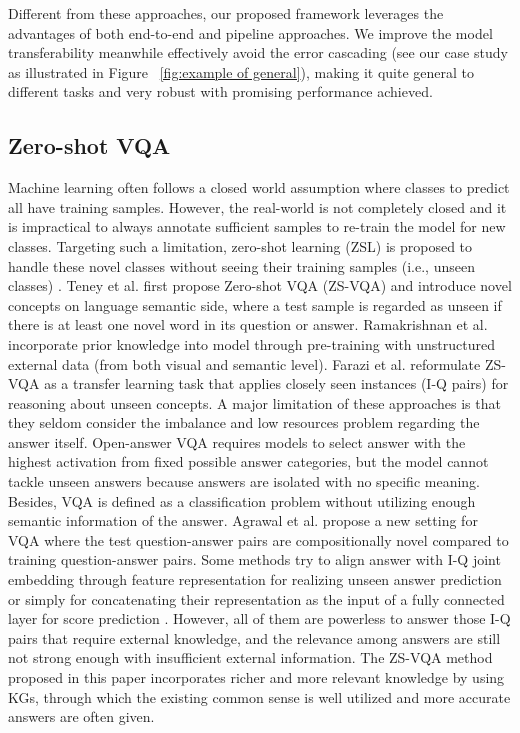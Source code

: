 \documentclass[runningheads]{llncs}
\newcommand{\cjy}[1]{{\color{black}#1}}
\begin{document}
Different from these approaches, our proposed framework leverages \cjy{the advantages of both end-to-end and pipeline approaches}. We improve the model transferability meanwhile \cjy{effectively avoid} the error cascading (see our case study as illustrated in Figure~ \ref{fig:example of general}), \cjy{making it quite general to different tasks and very robust with promising performance achieved.}
\subsection{Zero-shot VQA}\label{tab:Zero-shot VQA}
Machine learning often follows a closed world assumption \cjy{where classes to predict all have training samples.}
 However, the real-world is not completely closed and it is impractical to always annotate sufficient samples to re-train the model for new classes. Targeting such a limitation, zero-shot learning (ZSL) is proposed to handle these novel classes without seeing their training samples (i.e., unseen classes) \cite{DBLP:conf/www/GengC0PYYJC21,chen2021knowledge}.
Teney et al. \cite{DBLP:journals/corr/TeneyH16a} first propose Zero-shot VQA (ZS-VQA) and introduce novel concepts on language semantic side, where a test sample is regarded as unseen if there is at least one novel word in its question or answer. 
Ramakrishnan et al. \cite{DBLP:conf/cvpr/RamakrishnanPSM17} incorporate prior knowledge into model through pre-training with unstructured external data (from both visual and semantic level). 
Farazi et al. \cite{DBLP:journals/ivc/FaraziKB20} 
reformulate ZS-VQA as a transfer learning task that applies closely seen instances (I-Q pairs) for reasoning about unseen concepts. 
A major limitation of these approaches is that they seldom consider the imbalance and low resources problem regarding the answer itself.
Open-answer VQA requires  models to select answer with the highest activation from fixed possible  answer categories, but the model cannot tackle unseen answers because answers are isolated with no specific meaning. Besides, VQA is defined as a classification problem without utilizing enough semantic information of the answer.
Agrawal et al. \cite{DBLP:journals/corr/AgrawalKBP17} propose a new setting for VQA where the test question-answer pairs are compositionally novel compared to training question-answer pairs.
Some methods \cite{DBLP:conf/cvpr/HuCS18,DBLP:journals/corr/abs-2005-01239} try to align answer with I-Q joint embedding through feature representation for realizing unseen answer prediction or simply for concatenating their representation as the input of a fully connected layer for score prediction \cite{DBLP:journals/corr/TeneyH16a}. 
However, all of them are powerless to answer those I-Q pairs that require external knowledge, and the relevance among answers are still not strong enough with insufficient external information. 
\cjy{The ZS-VQA method proposed in this paper incorporates richer and more relevant knowledge by using KGs, through which the existing common sense is well utilized and more accurate answers are often given.}
\end{document}
